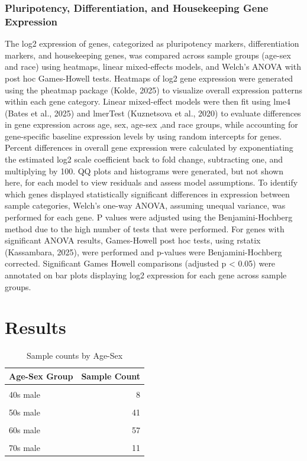 \documentclass[
  letterpaper,
  DIV=11,
  numbers=noendperiod]{scrartcl}
\begin{document}
\subsubsection{Pluripotency, Differentiation, and Housekeeping Gene
Expression}\label{pluripotency-differentiation-and-housekeeping-gene-expression}

The log2 expression of genes, categorized as pluripotency markers,
differentiation markers, and housekeeping genes, was compared across
sample groups (age-sex and race) using heatmaps, linear mixed-effects
models, and Welch's ANOVA with post hoc Games-Howell tests. Heatmaps of
log2 gene expression were generated using the pheatmap package (Kolde,
2025) to visualize overall expression patterns within each gene
category. Linear mixed-effect models were then fit using lme4 (Bates et
al., 2025) and lmerTest (Kuznetsova et al., 2020) to evaluate
differences in gene expression across age, sex, age-sex ,and race
groups, while accounting for gene-specific baseline expression levels by
using random intercepts for genes. Percent differences in overall gene
expression were calculated by exponentiating the estimated log2 scale
coefficient back to fold change, subtracting one, and multiplying by
100. QQ plots and histograms were generated, but not shown here, for
each model to view residuals and assess model assumptions. To identify
which genes displayed statistically significant differences in
expression between sample categories, Welch's one-way ANOVA, assuming
unequal variance, was performed for each gene. P values were adjusted
using the Benjamini-Hochberg method due to the high number of tests that
were performed. For genes with significant ANOVA results, Games-Howell
post hoc tests, using rstatix (Kassambara, 2025), were performed and
p-values were Benjamini-Hochberg corrected. Significant Games Howell
comparisons (adjusted p \textless{} 0.05) were annotated on bar plots
displaying log2 expression for each gene across sample groups.

\section{Results}\label{results}

\begin{table}[!h]
\centering
\caption{\label{tab:count_tables}Sample counts by Age-Sex}
\centering
\begin{tabular}[t]{lr}
\toprule
Age-Sex Group & Sample Count\\
\midrule
\cellcolor{gray!10}{40s female} & \cellcolor{gray!10}{34}\\
40s male & 8\\
\cellcolor{gray!10}{50s female} & \cellcolor{gray!10}{63}\\
50s male & 41\\
\cellcolor{gray!10}{60s female} & \cellcolor{gray!10}{77}\\
\addlinespace
60s male & 57\\
\cellcolor{gray!10}{70s female} & \cellcolor{gray!10}{17}\\
70s male & 11\\
\bottomrule
\end{tabular}
\end{table}
\end{document}
